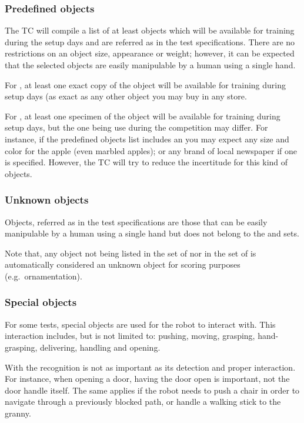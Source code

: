 \subsubsection{Predefined objects}
The TC will compile a list of at least \NumObjects objects which will be available for training during the setup days and are referred as  in the test specifications. There are no restrictions on an object size, appearance or weight; however, it can be expected that the selected objects are easily manipulable by a human using a single hand.

For , at least one exact copy of the object will be available for training during setup days (as exact as any other  object you may buy in any store.

For , at least one specimen of the object will be available for training during setup days, but the one being use during the competition may differ. For instance, if the predefined objects list includes an  you may expect any size and color for the apple (even marbled apples); or any brand of local newspaper if one is specified. However, the TC will try to reduce the incertitude for this kind of objects. 

\subsubsection{Unknown objects}
Objects, referred as  in the test specifications are those that can be easily manipulable by a human using a single hand but does not belong to the  and  sets.

Note that, any object not being listed in the set of  nor in the set of  is automatically considered an unknown object for scoring purposes (e.g.~ornamentation).

\subsubsection{Special objects}
For some tests, special objects are used for the robot to interact with. This interaction includes, but is not limited to: pushing, moving, grasping, hand-grasping, delivering, handling and opening.

With  the recognition is not as important as its detection and proper interaction. For instance, when opening a door, having the door open is important, not the door handle itself. The same applies if the robot needs to push a chair in order to navigate through a previously blocked path, or handle a walking stick to the granny.

